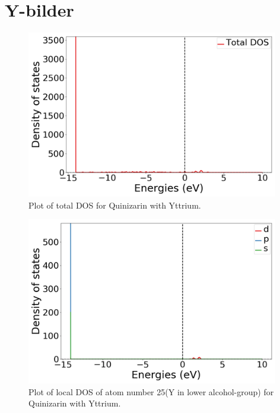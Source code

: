 \documentclass{article}
\begin{document}
\vspace{1cm}

\section{Y-bilder}

  \begin{figure}[H]
      \centering
      \includegraphics[width = 11cm]{../fig/Y_TDOS_1.png}
      \caption{Plot of total DOS for Quinizarin with Yttrium. }
      \label{fig:Y_TDOS_1}
  \end{figure}

  \begin{figure}[H]
      \centering
      \includegraphics[width = 11cm]{../fig/Y_LDOS25_1.png}
      \caption{Plot of local DOS of atom number 25(Y in lower alcohol-group) for Quinizarin with Yttrium. }
      \label{fig:Y_LDOS25_1}
  \end{figure}
\end{document}
